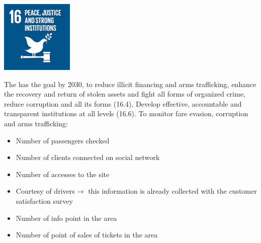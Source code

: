 \begin{minipage}[c]{0.2\textwidth}
    \includegraphics[width=\textwidth]{Images/Social_sustainability/16_peace.png}
\end{minipage}
\begin{minipage}[c]{0.8\textwidth}
The has the goal by 2030, to reduce illicit financing and arms trafficking, enhance the recovery and return of stolen assets and fight all forms of organized crime, reduce corruption and all its forms (16.4), Develop effective, accountable and transparent institutions at all levels (16.6).
To monitor fare evasion, corruption and arms trafficking:
\begin{itemize}
    \item Number of passengers checked
    \item Number of clients connected on social network
    \item Number of accesses to the site
    \item Courtesy of drivers$\rightarrow$ this information is already collected with the customer satisfaction survey
    \item Number of info point in the area 
    \item Number of point of sales of tickets in the area
\end{itemize}
\end{minipage}
